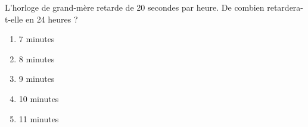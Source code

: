 L'horloge de grand-mère retarde de 20 secondes par heure. De combien retardera-t-elle en 24 heures ?
\begin{multicols}{5}
\begin{enumerate}[A/]
\item 7 minutes
\item 8 minutes
\item 9 minutes
\item 10 minutes
\item 11 minutes
\end{enumerate}  
\end{multicols}
